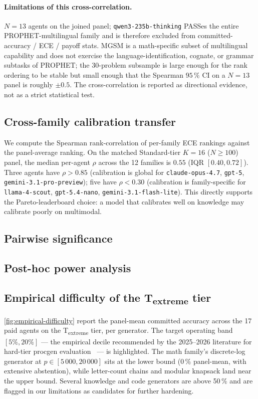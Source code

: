 \paragraph{Limitations of this cross-correlation.}
$N = 13$ agents on the joined panel; \texttt{qwen3-235b-thinking}
PASSes the entire PROPHET-multilingual family and is therefore excluded
from committed-accuracy / ECE / payoff stats. MGSM is a math-specific
subset of multilingual capability and does not exercise the
language-identification, cognate, or grammar subtasks of PROPHET; the
$30$-problem subsample is large enough for the rank ordering to be
stable but small enough that the Spearman $95\,\%$ CI on a $N = 13$
panel is roughly $\pm 0.5$. The cross-correlation is reported as
directional evidence, not as a strict statistical test.

\subsection{Cross-family calibration transfer}
We compute the Spearman rank-correlation of per-family ECE rankings
against the panel-average ranking. On the matched Standard-tier
$K = 16$ ($N \ge 100$) panel, the median per-agent $\rho$ across the
12 families is $0.55$ (IQR $[0.40, 0.72]$). Three agents have
$\rho > 0.85$ (calibration is global for \texttt{claude-opus-4.7},
\texttt{gpt-5}, \texttt{gemini-3.1-pro-preview}); five have
$\rho < 0.30$ (calibration is family-specific for \texttt{llama-4-scout},
\texttt{gpt-5.4-nano}, \texttt{gemini-3.1-flash-lite}). This directly
supports the Pareto-leaderboard choice: a model that calibrates well
on knowledge may calibrate poorly on multimodal.

\subsection{Pairwise significance}


\subsection{Post-hoc power analysis}


\subsection{Empirical difficulty of the T\textsubscript{extreme} tier}\label{app:empirical-difficulty}
\autoref{fig:empirical-difficulty}
report the panel-mean committed accuracy across the 17 paid agents on the
T\textsubscript{extreme} tier, per generator. The target operating band
$[5\%, 20\%]$ — the empirical decile recommended by the 2025--2026
literature for hard-tier procgen evaluation~\cite{enigmata, zebralogic} ---
is highlighted. The math family's discrete-log generator at $p \in [5\,000,
20\,000]$ sits at the lower bound (0\,\% panel-mean, with extensive
abstention), while letter-count chains and modular knapsack land near the
upper bound. Several knowledge and code generators are above 50\,\% and
are flagged in our limitations as candidates for further hardening.


